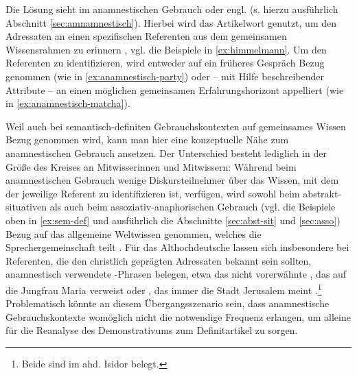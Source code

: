 Die Lösung sieht \textcite{Himmelmann1997} im anamnestischen Gebrauch oder engl.  (s. hierzu ausführlich Abschnitt \ref{sec:amnamnestisch}). Hierbei wird das Artikelwort genutzt, um den Adressaten an einen spezifischen Referenten aus dem gemeinsamen Wissensrahmen zu erinnern \parencite[61 und 81]{Himmelmann1997}, vgl. die Beispiele in \ref{ex:himmelmann}. Um den Referenten zu identifizieren, wird  entweder auf ein früheres Gespräch Bezug genommen (wie in \ref{ex:anamnestisch-party}) oder -- mit Hilfe beschreibender Attribute --  an einen möglichen gemeinsamen Erfahrungshorizont appelliert (wie in \ref{ex:anamnestisch-matcha}).  

 \begin{exe}
	\ex 
	\begin{xlist} \label{ex:himmelmann}
		\ex \label{ex:anamnestisch-party}  
		\ex \label{ex:anamnestisch-matcha}   
		\end{xlist}
\end{exe}

\noindent
Weil auch bei semantisch-definiten Gebrauchskontexten auf gemeinsames Wissen Bezug genommen wird, kann man hier eine konzeptuelle Nähe zum anamnestischen Gebrauch ansetzen. Der Unterschied besteht lediglich 
in der Größe des Kreises an Mitwisserinnen und Mitwissern: Während beim anamnestischen Gebrauch wenige  Diskursteilnehmer über das Wissen, mit dem der jeweilige Referent zu identifizieren ist, verfügen, wird sowohl beim abstrakt-situativen als auch beim assoziativ-anaphorischen Gebrauch (vgl. die Beispiele oben in \ref{ex:sem-def} und ausführlich die Abschnitte \ref{sec:abst-sit} und  \ref{sec:asso}) Bezug auf das allgemeine Weltwissen genommen, welches die Sprechergemeinschaft teilt \parencite[95]{Himmelmann1997}. Für das Althochdeutsche lassen sich insbesondere bei Referenten, die den christlich geprägten Adressaten bekannt sein sollten, anamnestisch verwendete -Phrasen belegen, etwa das nicht vorerwähnte ,  das auf die Jungfrau Maria verweist \parencite[74]{Szczepaniak2011a} oder , das immer die Stadt Jerusalem meint \parencite{Flick2018}.\footnote{Beide sind im ahd. Isidor belegt.} Problematisch könnte an diesem Übergangsszenario sein, dass anamnestische Gebrauchskontexte womöglich nicht die notwendige Frequenz erlangen, um alleine für die Reanalyse des Demonstrativums zum Definitartikel zu sorgen. 

